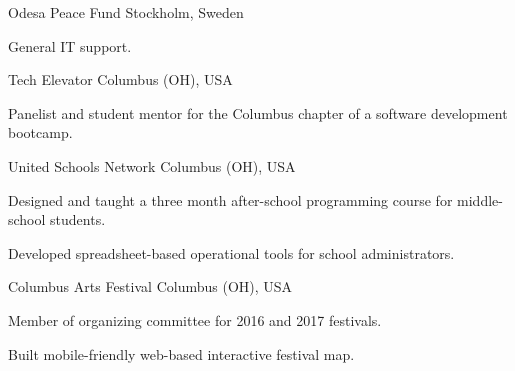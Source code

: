 

\begin{cventries}

  \cventryshort
    {Odesa Peace Fund} %
    {Stockholm, Sweden} %
    {
      \begin{cvitems} %
        \item {General IT support.}
      \end{cvitems}
    }

  \cventryshort
    {Tech Elevator} %
    {Columbus (OH), USA} %
    {
      \begin{cvitems} %
        \item {Panelist and student mentor for the Columbus chapter of a software development bootcamp.}
      \end{cvitems}
    }

  \cventryshort
    {United Schools Network} %
    {Columbus (OH), USA} %
    {
      \begin{cvitems} %
        \item {Designed and taught a three month after-school programming course for middle-school students.}
        \item {Developed spreadsheet-based operational tools for school administrators.}
      \end{cvitems}
    }

  \cventryshort
    {Columbus Arts Festival} %
    {Columbus (OH), USA} %
    {
      \begin{cvitems} %
        \item {Member of organizing committee for 2016 and 2017 festivals.}
        \item {Built mobile-friendly web-based interactive festival map.}
      \end{cvitems}
    }

\end{cventries}
